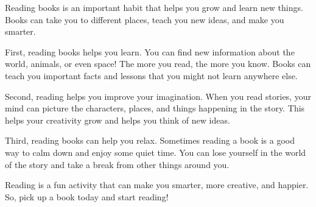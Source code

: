 \documentclass[12pt]{article}
\begin{document}
\begin{tcolorbox}[colframe=black!60, colback=white, 
coltitle=black, colbacktitle=black!15, fonttitle=\bfseries\Large, 
title=Text: Why Reading Books is Important, halign title=center, left=10pt, right=10pt, top=10pt, bottom=15pt]
Reading books is an important habit that helps you grow and learn new things. Books can take you to different places, teach you new ideas, and make you smarter.

First, reading books helps you learn. You can find new information about the world, animals, or even space! The more you read, the more you know. Books can teach you important facts and lessons that you might not learn anywhere else.

Second, reading helps you improve your imagination. When you read stories, your mind can picture the characters, places, and things happening in the story. This helps your creativity grow and helps you think of new ideas.

Third, reading books can help you relax. Sometimes reading a book is a good way to calm down and enjoy some quiet time. You can lose yourself in the world of the story and take a break from other things around you.

Reading is a fun activity that can make you smarter, more creative, and happier. So, pick up a book today and start reading!



     \end{tcolorbox}
\end{document}
